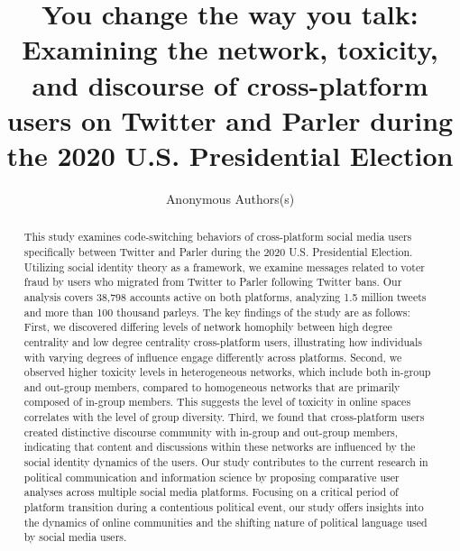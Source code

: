 \documentclass[Crown,sagev,times]{sagej}
\begin{document}
\title{You change the way you talk:
Examining the network, toxicity, and discourse
of cross-platform users on Twitter and Parler
during the 2020 U.S. Presidential Election}

\author{Anonymous Authors(s)}

\begin{abstract}
This study examines code-switching behaviors of cross-platform social media users specifically between Twitter and Parler
during the 2020 U.S. Presidential Election. Utilizing social identity theory as a framework, we examine messages related to voter fraud by 
users who migrated from Twitter to Parler following Twitter bans. Our analysis covers 38,798 accounts active on both platforms, 
analyzing 1.5 million tweets and more than 100 thousand parleys. The key findings of the study are as follows: 
First, we discovered differing levels of network homophily between high degree centrality and low degree centrality cross-platform users, 
illustrating how individuals with varying degrees of influence engage differently across platforms. Second, we observed higher toxicity levels 
in heterogeneous networks, which include both in-group and out-group members, compared to homogeneous networks that are primarily composed of in-group members. 
This suggests the level of toxicity in online spaces correlates with the level of group diversity. 
Third, we found that cross-platform users created distinctive discourse community with in-group and out-group members, 
indicating that content and discussions within these networks are influenced by the social identity dynamics of the users. 
Our study contributes to the current research in political communication and information science by proposing comparative user analyses across multiple social media platforms. 
Focusing on a critical period of platform transition during a contentious political event, our study offers insights into the dynamics of online communities 
and the shifting nature of political language used by social media users.
\end{abstract}


\maketitle
\end{document}
